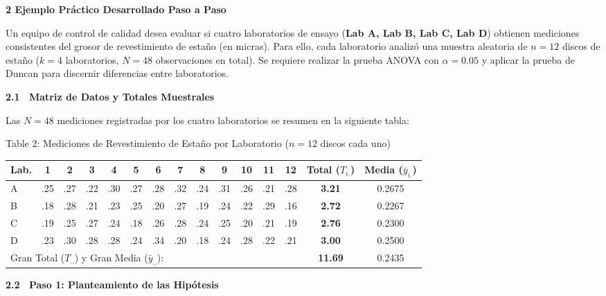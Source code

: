 \documentclass[10pt,a4paper]{article}
\begin{document}
\textbf{\large 2 \quad Ejemplo Práctico Desarrollado Paso a Paso}

\begin{tcolorbox}[colback=teal!6, colframe=teal!55!black, title={\small\bfseries Enunciado del Ejemplo Integrado}, boxsep=1pt, left=4pt, right=4pt, top=2pt, bottom=2pt]
{\small
Un equipo de control de calidad desea evaluar si cuatro laboratorios de ensayo (\textbf{Lab A, Lab B, Lab C, Lab D}) obtienen mediciones consistentes del grosor de revestimiento de estaño (en micras). Para ello, cada laboratorio analizó una muestra aleatoria de $n=12$ discos de estaño ($k=4$ laboratorios, $N=48$ observaciones en total). Se requiere realizar la prueba ANOVA con $\alpha=0.05$ y aplicar la prueba de Duncan para discernir diferencias entre laboratorios.
}
\end{tcolorbox}

\textbf{2.1 \ Matriz de Datos y Totales Muestrales}

Las $N=48$ mediciones registradas por los cuatro laboratorios se resumen en la siguiente tabla:

\begin{center}
\vspace{-2pt}
{\footnotesize Table 2: Mediciones de Revestimiento de Estaño por Laboratorio ($n=12$ discos cada uno)}

\vspace{2pt}
{\small
\begin{tabular}{l c c c c c c c c c c c c | c c}
\toprule
Lab. & 1 & 2 & 3 & 4 & 5 & 6 & 7 & 8 & 9 & 10 & 11 & 12 & Total ($T_{i.}$) & Media ($\bar{y}_{i.}$) \\
\midrule
A & .25 & .27 & .22 & .30 & .27 & .28 & .32 & .24 & .31 & .26 & .21 & .28 & \textbf{3.21} & 0.2675 \\
B & .18 & .28 & .21 & .23 & .25 & .20 & .27 & .19 & .24 & .22 & .29 & .16 & \textbf{2.72} & 0.2267 \\
C & .19 & .25 & .27 & .24 & .18 & .26 & .28 & .24 & .25 & .20 & .21 & .19 & \textbf{2.76} & 0.2300 \\
D & .23 & .30 & .28 & .28 & .24 & .34 & .20 & .18 & .24 & .28 & .22 & .21 & \textbf{3.00} & 0.2500 \\
\midrule
\multicolumn{13}{l}{Gran Total ($T_{..}$) y Gran Media ($\bar{y}_{..}$):} & \textbf{11.69} & 0.2435 \\
\bottomrule
\end{tabular}
}
\end{center}

\textbf{2.2 \ Paso 1: Planteamiento de las Hipótesis}
\end{document}
